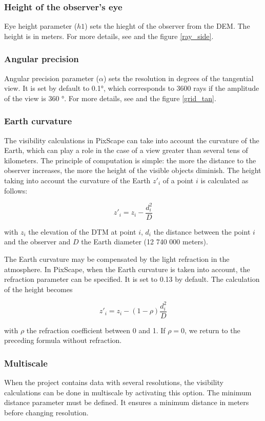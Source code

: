 \documentclass{report}
\begin{document}
\subsubsection{Height of the observer's eye}
Eye height parameter ($h1$) sets the hieght of the observer from the DEM. The height is in meters. For more details, see  and the figure \ref{ray_side}.

\subsubsection{Angular precision}
Angular precision parameter ($\alpha$) sets the resolution in degrees of the tangential view. It is set by default to 0.1°, which corresponds to 3600 rays if the amplitude of the view is 360 °. For more details, see  and the figure \ref{grid_tan}.

\subsubsection{Earth curvature}
\label{curvature}
The visibility calculations in PixScape can take into account the curvature of the Earth, which can play a role in the case of a view greater than several tens of kilometers. The principle of computation is simple: the more the distance to the observer increases, the more the height of the visible objects diminish.
The height taking into account the curvature of the Earth $z'_i$ of a point $i$ is calculated as follows:

$$z'_i = z_i - \frac{d_i^2}{D}$$

with $z_i$ the elevation of the DTM at point $i$, $d_i$ the distance between the point $i$ and the observer and $D$ the Earth diameter (12 740 000 meters).

The Earth curvature may be compensated by the light refraction in the atmosphere.
In PixScape, when the Earth curvature is taken into account, the refraction parameter can be specified. It is set to 0.13 by default. The calculation of the height becomes

$$z'_i = z_i - (1-\rho)\frac{d_i^2}{D}$$

with $\rho$ the refraction coefficient between 0 and 1. If $\rho=0$, we return to the preceding formula without refraction.


\subsubsection{Multiscale}
When the project contains data with several resolutions, the visibility calculations can be done in multiscale by activating this option. The minimum distance parameter must be defined. It ensures a minimum distance in meters before changing resolution.
\end{document}
